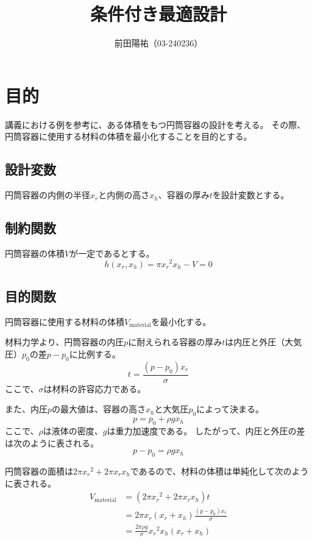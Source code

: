 \documentclass{jsarticle}
\begin{document}
\title{条件付き最適設計}
\author{前田陽祐（03-240236）}
\maketitle

\section{目的}
講義における例を参考に、ある体積をもつ円筒容器の設計を考える。
その際、円筒容器に使用する材料の体積を最小化することを目的とする。

\subsection{設計変数}
円筒容器の内側の半径${x_r}$と内側の高さ${x_h}$、容器の厚み$t$を設計変数とする。

\subsection{制約関数}
円筒容器の体積$V$が一定であるとする。
\begin{equation}
  h({x_r}, {x_h}) = \pi {x_r}^2 {x_h} - V = 0
\end{equation}

\subsection{目的関数}
円筒容器に使用する材料の体積$V_{\text{material}}$を最小化する。

材料力学より、円筒容器の内圧$p$に耐えられる容器の厚み$t$は内圧と外圧（大気圧）$p_0$の差$p-p_0$に比例する。
\begin{equation}
  t = \frac{(p-p_0) {x_r}}{\sigma}
\end{equation}
ここで、$\sigma$は材料の許容応力である。

また、内圧$p$の最大値は、容器の高さ${x_h}$と大気圧$p_0$によって決まる。
\begin{equation}
  p = p_0 + \rho g {x_h}
\end{equation}
ここで、$\rho$は液体の密度、$g$は重力加速度である。
したがって、内圧と外圧の差は次のように表される。
\begin{equation}
  p - p_0 = \rho g {x_h}
\end{equation}

円筒容器の面積は$2\pi {x_r}^2 + 2\pi {x_r} {x_h}$であるので、材料の体積は単純化して次のように表される。
\begin{align}
  V_{\text{material}} &= (2\pi {x_r}^2 + 2\pi {x_r} {x_h}) t \\
                      &=  2\pi {x_r} ({x_r}+{x_h}) \frac{(p-p_0) {x_r}}{\sigma} \\
                      &= \frac{2\pi\rho g }{\sigma} {x_r}^2 {x_h}({x_r}+{x_h})
\end{align}
\end{document}
